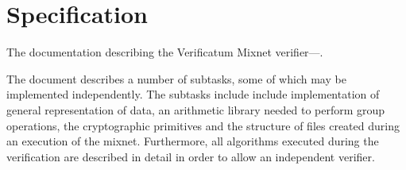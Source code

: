 \section{Specification}

The documentation describing the Verificatum Mixnet verifier---.

The document describes a number of subtasks, some of which may be
implemented independently. The subtasks include include implementation
of general representation of data, an arithmetic library needed to
perform group operations, the cryptographic primitives and the
structure of files created during an execution of the
mixnet. Furthermore, all algorithms executed during the verification
are described in detail in order to allow an independent verifier.




